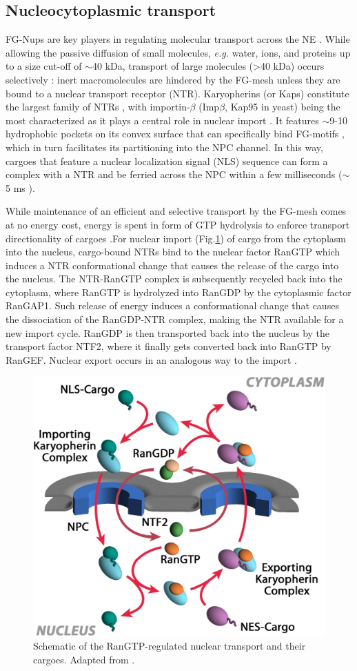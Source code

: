 \subsection{Nucleocytoplasmic transport}
FG-Nups are key players in regulating molecular transport across the NE \cite{Wente2000}. While allowing the passive diffusion of small molecules, \emph{e.g.} water, ions, and proteins up to a size cut-off of $\sim$40 kDa, transport of large molecules (>40 kDa) occurs selectively \cite{Zilman2007}: inert macromolecules are hindered by the FG-mesh unless they are bound to a nuclear transport receptor (NTR). Karyopherins (or Kaps) constitute the largest family of NTRs \cite{Tu2011}, with importin-$\beta$ (Imp$\beta$, Kap95 in yeast) being the most characterized as it plays a central role in nuclear import \cite{Harel2004}. It features $\sim$9-10 hydrophobic pockets on its convex surface that can specifically bind FG-motifs \cite{Bayliss2000}, which in turn facilitates its partitioning into the NPC channel. In this way, cargoes that feature a nuclear localization signal (NLS) sequence can form a complex with a NTR and be ferried across the NPC within a few milliseconds ($\sim$5 ms \cite{Dange2008}). 

While maintenance of an efficient and selective transport by the FG-mesh comes at no energy cost, energy is spent in form of GTP hydrolysis to enforce transport directionality of cargoes \cite{Gorlich1996a,Jovanovic-Talisman2017}.For nuclear import (Fig.\ref{fig:fig1.4}) of cargo from the cytoplasm into the nucleus, cargo-bound NTRs bind to the nuclear factor RanGTP which induces a NTR conformational change that causes the release of the cargo into the nucleus. The NTR-RanGTP complex is subsequently recycled back into the cytoplasm, where RanGTP is hydrolyzed into RanGDP by the cytoplasmic factor RanGAP1. Such release of energy induces a conformational change that causes the dissociation of the RanGDP-NTR complex, making the NTR available for a new import cycle. RanGDP is then transported back into the nucleus by the transport factor NTF2, where it finally gets converted back into RanGTP by RanGEF. Nuclear export occurs in an analogous way to the import \cite{Cautain2015}.
\begin{figure}[!htbp]
	\centering
	\includegraphics[width=0.65\linewidth]{figures/Figure1.4.pdf}
	\caption{Schematic of the RanGTP-regulated nuclear transport and their cargoes. Adapted from \cite{Aitchison2012}.}
	\label{fig:fig1.4}
\end{figure}

